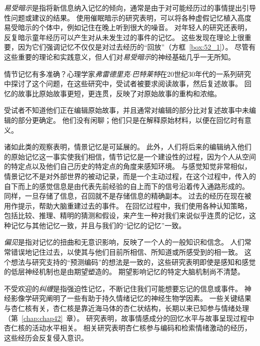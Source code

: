 \textit{易受暗示}是指将新信息纳入记忆的倾向，通常是由于对可能经历过的事情提出引导性问题或建议的结果。
使用催眠暗示的研究表明，可以将各种虚假记忆植入高度易受暗示的个体中，例如记住在晚上听到很大的噪音。
对年轻人的研究还表明，反复暗示童年经历可以产生对从未发生过的事件的记忆。
这些发现在理论上很重要，因为它们强调记忆不仅仅是对过去经历的“回放”（方框~\ref{box:52_1}）。
尽管有这些重要的理论和实践意义，但人们对\textit{易受暗示}的神经基础几乎一无所知。


\begin{proposition}[情节记忆在回忆过程中会发生变化] \label{box:52_1}
	
	\quad \quad 情节记忆有多准确？心理学家\textit{弗雷德里克$\cdot$巴特莱特}在20世纪30年代的一系列研究中探讨了这个问题，在这些研究中，受试者被要求阅读故事，然后复述故事。
	回忆的故事比原始故事更短，更连贯，反映了对原始故事的重构和浓缩。
	
	\quad \quad 受试者不知道他们正在编辑原始故事，并且通常对编辑的部分比对复述故事中未编辑的部分更确定。
	他们没有闲聊；他们只是在解释原始材料，以便在回忆时有意义。
	
	\quad \quad 诸如此类的观察表明，情景记忆是可延展的。
	此外，人们将后来的编辑纳入他们的原始记忆这一事实使我们相信，情节记忆是一个建设性的过程，因为个人从空间的特定点以及他们自己历史的特定点的角度来感知环境。
	与感觉知觉非常相似，情景记忆不是对外部世界的被动记录，而是一个主动过程，在这个过程中，传入的自下而上的感觉信息是由代表先前经验的自上而下的信号沿着传入通路形成的。
	同样，一旦存储了信息，召回就不是存储信息的精确副本。
	过去的经历在现在被用作提示，帮助大脑重建过去的事件。
	在回忆过程中，我们使用各种认知策略，包括比较、推理、精明的猜测和假设，来产生一种对我们来说似乎连贯的记忆，这种记忆与其他记忆一致，并且与我们的“记忆的记忆”一致。
	
\end{proposition}


\textit{偏见}是指对记忆的扭曲和无意识影响，反映了一个人的一般知识和信念。
人们常常错误地记住过去，以使其与他们目前所相信、所知道或所感受到的相一致。
这个想法与研究支持的“预测编码”的想法是一致的，这些研究表明即使是感知和感觉的低层神经机制也是由期望塑造的。
期望影响记忆的特定大脑机制尚不清楚。


不受欢迎的\textit{纠缠}是指强迫性记忆，不断记住我们可能想要忘记的信息或事件。
神经影像学研究阐明了一些有助于持久情绪记忆的神经生物学因素。
一些关键结果与杏仁核有关，杏仁核是靠近海马体的杏仁状结构，长期以来已知参与情绪处理（第~\ref{chap:chap42}~章）。
研究表明，故事情感成分的回忆水平与故事呈现过程中杏仁核的活动水平相关。
相关研究表明杏仁核参与编码和检索情绪激动的经历，这些经历会反复侵入意识。


